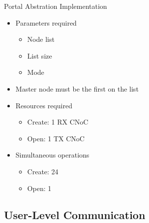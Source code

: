 		\begin{frame}[fragile]{Portal Abstration Implementation}
			\begin{itemize}
				\item Parameters required
				\begin{itemize}
					\item Node list
					\item List size
					\item Mode
				\end{itemize}
				\item Master node must be the first on the list
			\end{itemize}

			\begin{itemize}
				\item Resources required
				\begin{itemize}
					\item Create: 1 RX CNoC
					\item Open: 1 TX CNoC
				\end{itemize}
			\end{itemize}

			\begin{itemize}
				\item Simultaneous operations
				\begin{itemize}
					\item Create: 24
					\item Open: 1
				\end{itemize}
			\end{itemize}
		\end{frame}

	\subsection{User-Level Communication}



